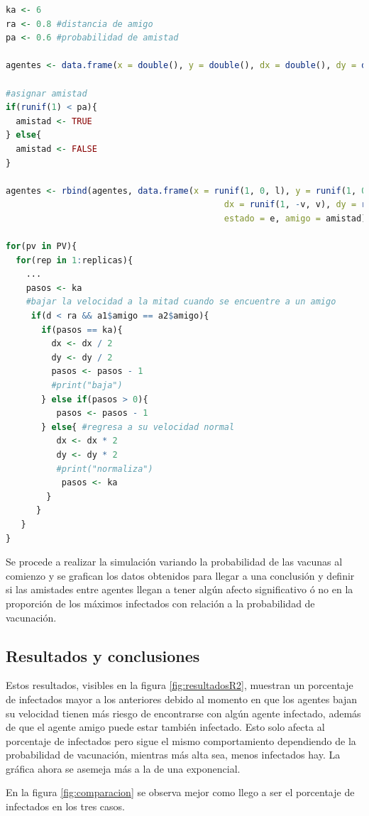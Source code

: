 \documentclass{article}
\begin{document}
\begin{lstlisting}[language=R]
ka <- 6 
ra <- 0.8 #distancia de amigo
pa <- 0.6 #probabilidad de amistad

agentes <- data.frame(x = double(), y = double(), dx = double(), dy = double(), estado  = character(), amigo = NULL)

#asignar amistad
if(runif(1) < pa){
  amistad <- TRUE
} else{
  amistad <- FALSE
}

agentes <- rbind(agentes, data.frame(x = runif(1, 0, l), y = runif(1, 0, l),
                                           dx = runif(1, -v, v), dy = runif(1, -v, v),
                                           estado = e, amigo = amistad))

for(pv in PV){
  for(rep in 1:replicas){
    ...
    pasos <- ka
    #bajar la velocidad a la mitad cuando se encuentre a un amigo
     if(d < ra && a1$amigo == a2$amigo){
       if(pasos == ka){
         dx <- dx / 2
         dy <- dy / 2
         pasos <- pasos - 1
         #print("baja")
       } else if(pasos > 0){
          pasos <- pasos - 1
       } else{ #regresa a su velocidad normal
          dx <- dx * 2
          dy <- dy * 2
          #print("normaliza")
           pasos <- ka
        }
      }
   }
}
\end{lstlisting}

Se procede a realizar la simulaci\'on variando la probabilidad de las vacunas al comienzo y se grafican los datos obtenidos para llegar a una conclusi\'on y definir si las amistades entre agentes llegan a tener alg\'un afecto significativo \'o no en la proporci\'on de los m\'aximos infectados con relaci\'on a la probabilidad de vacunaci\'on.

\subsection{Resultados y conclusiones}

Estos resultados, visibles en la figura \ref{fig:resultadosR2}, muestran un porcentaje de infectados mayor a los anteriores debido al momento en que los agentes bajan su velocidad tienen m\'as riesgo de encontrarse con alg\'un agente infectado, adem\'as de que el agente amigo puede estar tambi\'en infectado. Esto solo afecta al porcentaje de infectados pero sigue el mismo comportamiento dependiendo de la probabilidad de vacunaci\'on, mientras m\'as alta sea, menos infectados hay. La gr\'afica ahora se asemeja m\'as a la de una exponencial.

En la figura \ref{fig:comparacion} se observa mejor como llego a ser el porcentaje de infectados en los tres casos.
\end{document}
